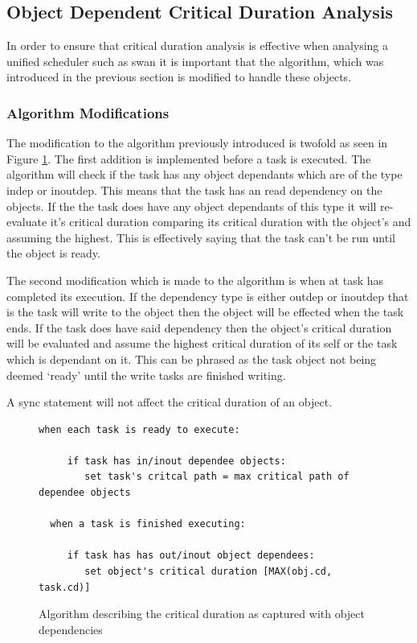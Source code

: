 \subsection{Object Dependent Critical Duration Analysis}
In order to ensure that critical duration analysis is effective when analysing a unified scheduler such as swan it is important that the algorithm, which was introduced in the previous section is modified to handle these objects.

\subsubsection{Algorithm Modifications}
The modification to the algorithm previously introduced is twofold as seen in Figure \ref{fig:code_deps}. The first addition is implemented before a task is executed. The algorithm will check if the task has any object dependants which are of the type indep or inoutdep. This means that the task has an read dependency on the objects. If the the task does have any object dependants of this type it will re-evaluate it's critical duration comparing its critical duration with the object's and assuming the highest. This is effectively saying that the task can't be run until the object is ready. 

The second modification which is made to the algorithm is when at task has completed its execution. If the dependency type is either outdep or inoutdep that is the task will write to the object then the object will be effected when the task ends. If the task does have said dependency then the object's critical duration will be evaluated and assume the highest critical duration of its self or the task which is dependant on it. This can be phrased as the task object not being deemed `ready' until the write tasks are finished writing.

A sync statement will not affect the critical duration of an object.

\begin{figure}
  \begin{lstlisting}[breaklines, showstringspaces=false]
  when each task is ready to execute:

     if task has in/inout dependee objects:
     	set task's critcal path = max critical path of dependee objects

  when a task is finished executing:

     if task has has out/inout object dependees:
     	set object's critical duration [MAX(obj.cd, task.cd)] 

  \end{lstlisting}
  \caption{Algorithm describing the critical duration as captured with object dependencies}
  \label{fig:code_deps}
\end{figure}

